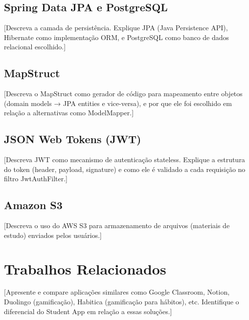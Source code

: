 \subsection{Spring Data JPA e PostgreSQL}
\label{subsec:jpa-postgres}

[Descreva a camada de persistência. Explique JPA (Java Persistence API), Hibernate
como implementação ORM, e PostgreSQL como banco de dados relacional escolhido.]

\subsection{MapStruct}
\label{subsec:mapstruct}

[Descreva o MapStruct como gerador de código para mapeamento entre objetos (domain
models → JPA entities e vice-versa), e por que ele foi escolhido em relação a
alternativas como ModelMapper.]

\subsection{JSON Web Tokens (JWT)}
\label{subsec:jwt}

[Descreva JWT como mecanismo de autenticação stateless. Explique a estrutura do
token (header, payload, signature) e como ele é validado a cada requisição no
filtro JwtAuthFilter.]

\subsection{Amazon S3}
\label{subsec:aws-s3}

[Descreva o uso do AWS S3 para armazenamento de arquivos (materiais de estudo)
enviados pelos usuários.]

\section{Trabalhos Relacionados}
\label{sec:trabalhos-relacionados}

[Apresente e compare aplicações similares como Google Classroom, Notion, Duolingo
(gamificação), Habitica (gamificação para hábitos), etc. Identifique o diferencial
do Student App em relação a essas soluções.]
